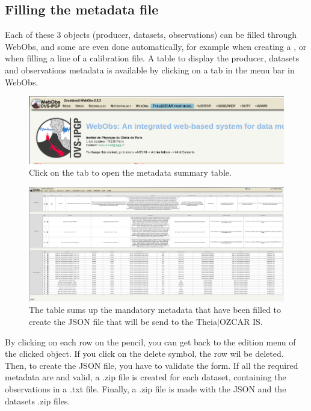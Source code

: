 \subsection{Filling the metadata file}

Each of these 3 objects (producer, datasets, observations) can be filled through WebObs, and some are even done automatically, for example when creating a , or when filling a line of a calibration file. A table to display the producer, datasets and observations metadata is available by clicking on a tab in the menu bar in WebObs.

\begin{figure}[!h]
	\centering
	\includegraphics[width=\textwidth]{figures/theia_tab.png}
	\caption{Click on the tab to open the metadata summary table.}
\end{figure}

\begin{figure}[!h]
	\centering
	\includegraphics[width=\textwidth]{figures/theia_recap_table.png}
	\caption{The table sums up the mandatory metadata that have been filled to create the JSON file that will be send to the Theia$\vert$OZCAR IS.}
\end{figure}

By clicking on each row on the pencil, you can get back to the edition menu of the clicked object. If you click on the delete symbol, the row wil be deleted. Then, to create the JSON file, you have to validate the form. If all the required metadata are  and valid, a .zip file is created for each dataset, containing the observations in a .txt file. Finally, a .zip file is made with the JSON and the datasets .zip files.

